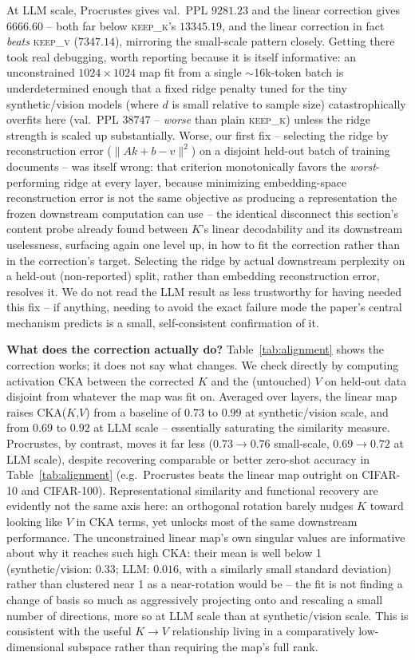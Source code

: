 \documentclass[11pt]{article}
\begin{document}
At LLM scale, Procrustes gives val.\ PPL $9281.23$ and the linear correction gives
$6666.60$ -- both far below \textsc{keep\_k}'s $13345.19$, and the linear correction
in fact \emph{beats} \textsc{keep\_v} ($7347.14$), mirroring the small-scale pattern
closely. Getting there took real debugging, worth reporting because it is itself
informative: an unconstrained $1024\times1024$ map fit from a single $\sim$16k-token
batch is underdetermined enough that a fixed ridge penalty tuned for the tiny
synthetic/vision models (where $d$ is small relative to sample size) catastrophically
overfits here (val.\ PPL $38747$ -- \emph{worse} than plain \textsc{keep\_k}) unless
the ridge strength is scaled up substantially. Worse, our first fix -- selecting the
ridge by reconstruction error ($\lVert Ak+b-v\rVert^2$) on a disjoint held-out batch
of training documents -- was itself wrong: that criterion monotonically favors the
\emph{worst}-performing ridge at every layer, because minimizing embedding-space
reconstruction error is not the same objective as producing a representation the
frozen downstream computation can use -- the identical disconnect this section's
content probe already found between $K$'s linear decodability and its downstream
uselessness, surfacing again one level up, in how to fit the correction rather than
in the correction's target. Selecting the ridge by actual downstream perplexity on a
held-out (non-reported) split, rather than embedding reconstruction error, resolves
it. We do not read the LLM result as less trustworthy for having needed this fix --
if anything, needing to avoid the exact failure mode the paper's central mechanism
predicts is a small, self-consistent confirmation of it.

\textbf{What does the correction actually do?} Table~\ref{tab:alignment} shows the
correction works; it does not say what changes. We check directly by computing
activation CKA between the corrected $K$ and the (untouched) $V$ on held-out data
disjoint from whatever the map was fit on. Averaged over layers, the linear map
raises CKA($K$,$V$) from a baseline of $0.73$ to $0.99$ at synthetic/vision scale, and
from $0.69$ to $0.92$ at LLM scale -- essentially saturating the similarity measure.
Procrustes, by contrast, moves it far less ($0.73 \to 0.76$ small-scale, $0.69 \to
0.72$ at LLM scale), despite recovering comparable or better zero-shot accuracy in
Table~\ref{tab:alignment} (e.g.\ Procrustes beats the linear map outright on CIFAR-10
and CIFAR-100). Representational similarity and functional recovery are evidently not
the same axis here: an orthogonal rotation barely nudges $K$ toward looking like $V$
in CKA terms, yet unlocks most of the same downstream performance. The unconstrained
linear map's own singular values are informative about why it reaches such high CKA:
their mean is well below 1 (synthetic/vision: $0.33$; LLM: $0.016$, with a similarly
small standard deviation) rather than clustered near 1 as a near-rotation would be --
the fit is not finding a change of basis so much as aggressively projecting onto and
rescaling a small number of directions, more so at LLM scale than at synthetic/vision
scale. This is consistent with the useful $K \to V$ relationship living in a
comparatively low-dimensional subspace rather than requiring the map's full rank.
\end{document}
